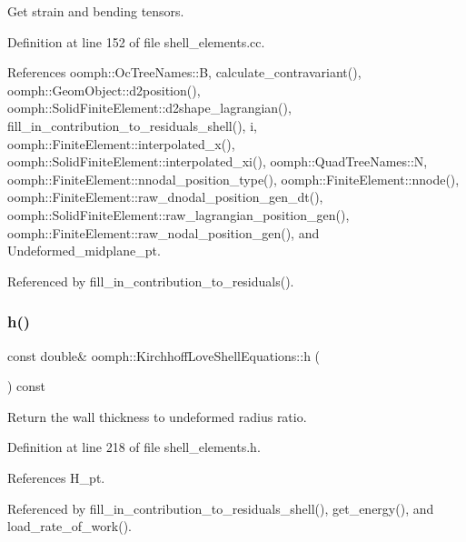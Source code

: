 Get strain and bending tensors. 

Definition at line 152 of file shell\+\_\+elements.\+cc.



References oomph\+::\+Oc\+Tree\+Names\+::B, calculate\+\_\+contravariant(), oomph\+::\+Geom\+Object\+::d2position(), oomph\+::\+Solid\+Finite\+Element\+::d2shape\+\_\+lagrangian(), fill\+\_\+in\+\_\+contribution\+\_\+to\+\_\+residuals\+\_\+shell(), i, oomph\+::\+Finite\+Element\+::interpolated\+\_\+x(), oomph\+::\+Solid\+Finite\+Element\+::interpolated\+\_\+xi(), oomph\+::\+Quad\+Tree\+Names\+::N, oomph\+::\+Finite\+Element\+::nnodal\+\_\+position\+\_\+type(), oomph\+::\+Finite\+Element\+::nnode(), oomph\+::\+Finite\+Element\+::raw\+\_\+dnodal\+\_\+position\+\_\+gen\+\_\+dt(), oomph\+::\+Solid\+Finite\+Element\+::raw\+\_\+lagrangian\+\_\+position\+\_\+gen(), oomph\+::\+Finite\+Element\+::raw\+\_\+nodal\+\_\+position\+\_\+gen(), and Undeformed\+\_\+midplane\+\_\+pt.



Referenced by fill\+\_\+in\+\_\+contribution\+\_\+to\+\_\+residuals().

\mbox{\label{classoomph_1_1KirchhoffLoveShellEquations_aeb942282a31b23af7ee1e710f098aa43}} 
\subsubsection{\texorpdfstring{h()}{h()}}
{\footnotesize\ttfamily const double\& oomph\+::\+Kirchhoff\+Love\+Shell\+Equations\+::h (\begin{DoxyParamCaption}{ }\end{DoxyParamCaption}) const\hspace{0.3cm}{\ttfamily [inline]}}



Return the wall thickness to undeformed radius ratio. 



Definition at line 218 of file shell\+\_\+elements.\+h.



References H\+\_\+pt.



Referenced by fill\+\_\+in\+\_\+contribution\+\_\+to\+\_\+residuals\+\_\+shell(), get\+\_\+energy(), and load\+\_\+rate\+\_\+of\+\_\+work().


